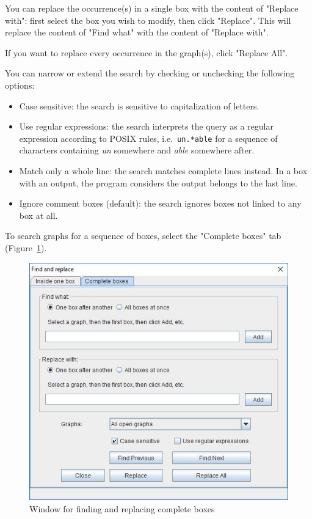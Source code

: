 \bigskip
\noindent You can replace the occurrence(s) in a single box with the content of
"Replace with": first select the box you wish to modify, then click "Replace".
This will replace the content of "Find what" with the content of "Replace with".

\bigskip
\noindent If you want to replace every occurrence in the graph(s), click "Replace
All".

\bigskip
\noindent You can narrow or extend the search by checking or unchecking the following
options:
\begin{itemize}
	\item	Case sensitive: the search is sensitive to capitalization of letters.
	\item	Use regular expressions: the search interprets the query as a regular
expression according to POSIX rules, i.e.\ \verb$un.*able$ for a sequence of characters
containing \textit{un} somewhere and \textit{able} somewhere after.
	\item	Match only a whole line: the search matches complete lines instead. In a box with an output, the program considers the output belongs to the last line.
	\item	Ignore comment boxes (default): the search ignores boxes not linked
	to any box at all.
\end{itemize}

\bigskip
\noindent To search graphs for a sequence of boxes, select the "Complete boxes"
tab (Figure~\ref{find-complete-boxes}).

\noindent 
\begin{figure}[!ht]
\begin{center}
\includegraphics[width=13.6cm]{resources/img/findandreplaceseq.jpg}
\caption{Window for finding and replacing complete boxes\label{find-complete-boxes}}
\end{center}
\end{figure}


